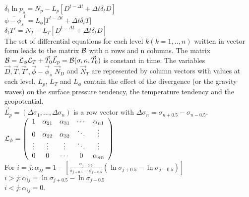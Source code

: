 ${\displaystyle \delta_t \ln p_s = N_p - L_p [D^{t - \Delta t} + \Delta t \delta_t D]}$\\


${\displaystyle \overline{ \phi - \phi_s}^t = L_{\phi} [T^{t - \Delta t} + \Delta t \delta_t T}]$\\


${\displaystyle \delta_t  T' =  N_T - L_T [D^{t - \Delta t} + \Delta t \delta_t D]} $\\

The set of differential equations
for each level $ k (k=1,..,n)$  written in
vector form leads to the matrix $ {\cal B}$ with n rows and
n columns. 
The matrix $ {\cal B} = {\cal L}_{\phi} {\cal L}_T + \vec{T}_0 \vec{L}_p = 
{\cal B}(\sigma , \kappa , \vec{T}_0)$ 
is constant in time. 
The variables ${\vec{D},\vec{T},\vec{T}',\vec{\phi}-\vec{\phi}_s}$
$\vec{N}_D$ and $\vec{N}_T$ are represented by column vectors with values
at each level. $L_p$, $L_T$ and $L_{\phi}$ contain the effect of the 
divergence (or the gravity waves) on 
the surface pressure tendency, the temperature tendency and the
geopotential.\\
 
$\vec{L}_p =(\Delta \sigma_1, ..., \Delta \sigma_n)$
is a row vector with
$ \Delta \sigma_n=\sigma_{n+0.5} - \sigma_{n-0.5}$.\\


${\cal L}_{\phi}=
{\left(\begin{array}{*{5}{c}}
            1 & \alpha_{21} &\alpha_{31}& \cdots & \alpha_{n1}    \\
            0 &\alpha_{22}  &\alpha_{32}& \ddots & \vdots   \\
            \vdots & \vdots & \vdots    & \ddots & \vdots   \\
            0      & 0      &  \cdots   & 0      & \alpha_{nn} \\
            \end{array}
            \right)} $\\


For $i=j: {\displaystyle \alpha_{jj}=1- [
 \frac{\sigma_{j-0.5}}{\sigma_{j+0.5}-\sigma_{j-0.5}}
(\ln \sigma_{j+0.5} - \ln \sigma_{j-0.5})]}$\\

$i>j: \alpha_{ij}=\ln \sigma_{j+0.5} - \ln \sigma_{j-0.5}$\\

$i<j: \alpha_{ij}=0$.\\



